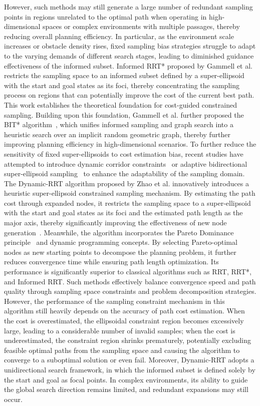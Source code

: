 \documentclass[sn-mathphys-num]{sn-jnl}%
\begin{document}
However, such methods may still generate a large number of redundant sampling points in regions unrelated to the optimal path when operating in high-dimensional spaces or complex environments with multiple passages, thereby reducing overall planning efficiency. In particular, as the environment scale increases or obstacle density rises, fixed sampling bias strategies struggle to adapt to the varying demands of different search stages, leading to diminished guidance effectiveness of the informed subset. Informed RRT* proposed by Gammell et al.~\cite{gammell2014informed,gammell2018informed} restricts the sampling space to an informed subset defined by a super-ellipsoid with the start and goal states as its foci, thereby concentrating the sampling process on regions that can potentially improve the cost of the current best path. This work establishes the theoretical foundation for cost-guided constrained sampling. Building upon this foundation, Gammell et al. further proposed the BIT* algorithm~\cite{gammell2015batch,gammell2020batch}, which unifies informed sampling and graph search into a heuristic search over an implicit random geometric graph, thereby further improving planning efficiency in high-dimensional scenarios. To further reduce the sensitivity of fixed super-ellipsoids to cost estimation bias, recent studies have attempted to introduce dynamic corridor constraints~\cite{yuan2023improved} or adaptive bidirectional super-ellipsoid sampling~\cite{zeng2025abf} to enhance the adaptability of the sampling domain. The Dynamic-RRT algorithm proposed by Zhao et al. innovatively introduces a heuristic super-ellipsoid constrained sampling mechanism. By estimating the path cost through expanded nodes, it restricts the sampling space to a super-ellipsoid with the start and goal states as its foci and the estimated path length as the major axis, thereby significantly improving the effectiveness of new node generation~\cite{zhao2023dynamic}. Meanwhile, the algorithm incorporates the Pareto Dominance principle~\cite{deb2002fast} and dynamic programming concepts. By selecting Pareto-optimal nodes as new starting points to decompose the planning problem, it further reduces convergence time while ensuring path length optimization. Its performance is significantly superior to classical algorithms such as RRT, RRT*, and Informed RRT. Such methods effectively balance convergence speed and path quality through sampling space constraints and problem decomposition strategies. However, the performance of the sampling constraint mechanism in this algorithm still heavily depends on the accuracy of path cost estimation. When the cost is overestimated, the ellipsoidal constraint region becomes excessively large, leading to a considerable number of invalid samples; when the cost is underestimated, the constraint region shrinks prematurely, potentially excluding feasible optimal paths from the sampling space and causing the algorithm to converge to a suboptimal solution or even fail. Moreover, Dynamic-RRT adopts a unidirectional search framework, in which the informed subset is defined solely by the start and goal as focal points. In complex environments, its ability to guide the global search direction remains limited, and redundant expansions may still occur.
\end{document}
